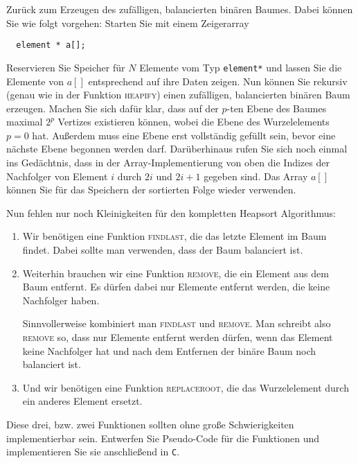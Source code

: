 \documentclass[tikz,12pt]{article}
\begin{document}
Zurück zum Erzeugen des zufälligen, balancierten binären Baumes. 
Dabei können Sie wie folgt vorgehen: 
Starten Sie mit einem Zeigerarray
\begin{lstlisting}
  element * a[];
\end{lstlisting}
Reservieren Sie Speicher für $N$ Elemente vom Typ \texttt{element*} und lassen Sie die Elemente von $a[]$ entsprechend auf ihre Daten zeigen.
Nun können Sie rekursiv (genau wie in der Funktion \textsc{heapify}) einen zufälligen, balancierten binären Baum erzeugen.
Machen Sie sich dafür klar, dass auf der $p$-ten Ebene des Baumes maximal $2^p$ Vertizes existieren können, wobei die Ebene des Wurzelelements $p=0$ hat.
Außerdem muss eine Ebene erst vollständig gefüllt sein, bevor eine nächste Ebene begonnen werden darf.
Darüberhinaus rufen Sie sich noch einmal ins Gedächtnis, dass in der Array-Implementierung von oben die Indizes der Nachfolger von Element $i$ durch $2i$ und $2i+1$ gegeben sind. 
Das Array $a[]$ können Sie für das Speichern der sortierten Folge wieder verwenden.

Nun fehlen nur noch Kleinigkeiten für den kompletten Heapsort Algorithmus:
\begin{enumerate}
\item Wir benötigen eine Funktion \textsc{findlast}, die das letzte Element im Baum findet. 
  Dabei sollte man verwenden, dass der Baum balanciert ist.
\item Weiterhin brauchen wir eine Funktion \textsc{remove}, die ein Element aus dem Baum entfernt.
  Es dürfen dabei nur Elemente entfernt werden, die keine Nachfolger haben.

  Sinnvollerweise kombiniert man \textsc{findlast} und \textsc{remove}. 
  Man schreibt also \textsc{remove} so, dass nur Elemente entfernt werden dürfen, wenn das Element keine Nachfolger hat und nach dem Entfernen der binäre Baum noch balanciert ist.
\item Und wir benötigen eine Funktion \textsc{replaceroot}, die das Wurzelelement durch ein anderes Element ersetzt.
\end{enumerate}
Diese drei, bzw. zwei Funktionen sollten ohne große Schwierigkeiten implementierbar sein.
Entwerfen Sie Pseudo-Code für die Funktionen und implementieren Sie sie anschließend in \texttt{C}.
\end{document}

